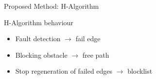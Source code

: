 





\begin{frame}[fragile]{Proposed Method: H-Algorithm} 
\begin{block}{H-Algorithm behaviour}
    \begin{itemize}
      \item Fault detection $\rightarrow$ fail edge
      \item Blocking obstacle $\rightarrow$ free path 
      \item Stop regeneration of failed edges $\rightarrow$ blocklist
    \end{itemize}
  \end{block}
\end{frame}
